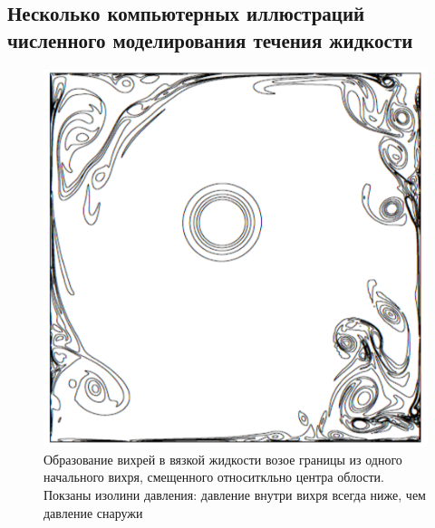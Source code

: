


\subsection{Несколько компьютерных иллюстраций численного моделирования течения жидкости}
\begin{figure}[htp]
\centering
\includegraphics[width=0.5\linewidth]{historyImg/vortex_small.pdf}
\caption{Образование вихрей в вязкой жидкости возое границы из одного начального вихря, смещенного относиткльно центра облости. Покзаны изолини давления:  давление внутри вихря всегда ниже, чем давление снаружи}
\end{figure}

